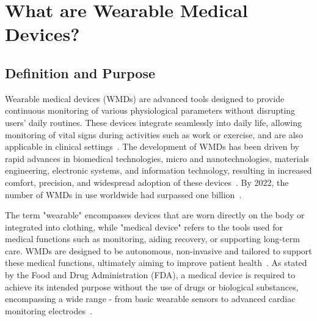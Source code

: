 \documentclass[journal]{IEEEtran}
\begin{document}

\section{What are Wearable Medical Devices?}
\label{2.What_are}
    \subsection{Definition and Purpose}

    Wearable medical devices (WMDs) are advanced tools designed to provide continuous monitoring of various physiological parameters without disrupting users' daily routines. These devices integrate seamlessly into daily life, allowing monitoring of vital signs during activities such as work or exercise, and are also applicable in clinical settings~\cite{Fotiadis2006}. The development of WMDs has been driven by rapid advances in biomedical technologies, micro and nanotechnologies, materials engineering, electronic systems, and information technology, resulting in increased comfort, precision, and widespread adoption of these devices~\cite{Fotiadis2006,Degerli2020}. By 2022, the number of WMDs in use worldwide had surpassed one billion~\cite{Statista}.

    The term "wearable" encompasses devices that are worn directly on the body or integrated into clothing, while "medical device" refers to the tools used for medical functions such as monitoring, aiding recovery, or supporting long-term care. WMDs are designed to be autonomous, non-invasive and tailored to support these medical functions, ultimately aiming to improve patient health~\cite{Degerli2020, Hemapriya2017}. As stated by the Food and Drug Administration (FDA), a medical device is required to achieve its intended purpose without the use of drugs or biological substances, encompassing a wide range - from basic wearable sensors to advanced cardiac monitoring electrodes~\cite{Khan2016, Ates2022}.
\end{document}
